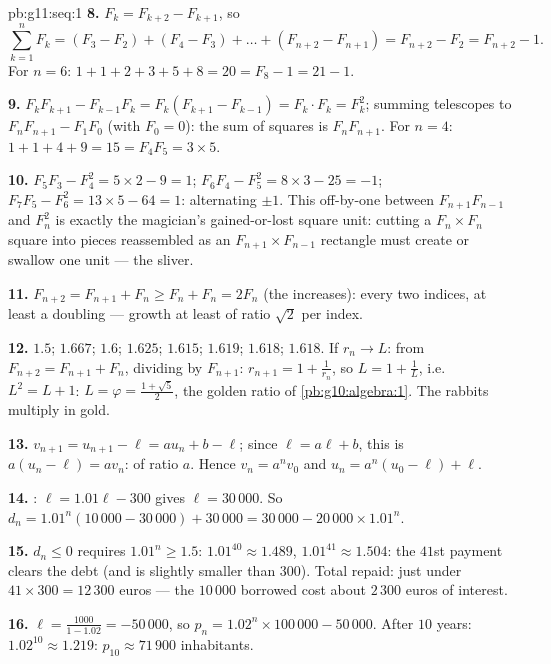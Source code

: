 \begin{solution}{pb:g11:seq:1}
\textbf{8.} $F_k = F_{k+2} - F_{k+1}$, so
\[
\sum_{k=1}^{n} F_k = (F_3 - F_2) + (F_4 - F_3) + \dots +
(F_{n+2} - F_{n+1}) = F_{n+2} - F_2 = F_{n+2} - 1 .
\]
For $n = 6$: $1 + 1 + 2 + 3 + 5 + 8 = 20 = F_8 - 1 = 21 - 1$.

\textbf{9.} $F_k F_{k+1} - F_{k-1} F_k = F_k (F_{k+1} -
F_{k-1}) = F_k \cdot F_k = F_k^2$; summing telescopes to
$F_n F_{n+1} - F_1 F_0$ (with $F_0 = 0$): the sum of squares is
$F_n F_{n+1}$. For $n = 4$: $1 + 1 + 4 + 9 = 15 = F_4 F_5 =
3 \times 5$.

\textbf{10.} $F_5 F_3 - F_4^2 = 5 \times 2 - 9 = 1$;
$F_6 F_4 - F_5^2 = 8 \times 3 - 25 = -1$;
$F_7 F_5 - F_6^2 = 13 \times 5 - 64 = 1$: alternating
$\pm 1$. This off-by-one between $F_{n+1} F_{n-1}$ and
$F_n^2$ is exactly the magician's gained-or-lost square unit:
cutting a $F_n \times F_n$ square into pieces reassembled as an
$F_{n+1} \times F_{n-1}$ rectangle must create or swallow one
unit --- the sliver.

\textbf{11.} $F_{n+2} = F_{n+1} + F_n \geq F_n + F_n = 2F_n$
(the  increases): every two indices, at least a
doubling --- growth at least  of ratio $\sqrt2$ per
index.

\textbf{12.} $1.5$; $1.667$; $1.6$; $1.625$; $1.615$;
$1.619$; $1.618$; $1.618$. If $r_n \to L$: from
$F_{n+2} = F_{n+1} + F_n$, dividing by $F_{n+1}$:
$r_{n+1} = 1 + \frac{1}{r_n}$, so $L = 1 + \frac1L$, i.e.\
$L^2 = L + 1$: $L = \varphi = \frac{1 + \sqrt5}{2}$, the golden
ratio of \cref{pb:g10:algebra:1}. The rabbits multiply in
gold.

\textbf{13.} $v_{n+1} = u_{n+1} - \ell = a u_n + b - \ell$;
since $\ell = a\ell + b$, this is $a(u_n - \ell) = a v_n$:
 of ratio $a$. Hence $v_n = a^n v_0$ and
$u_n = a^n (u_0 - \ell) + \ell$.

\textbf{14.} : $\ell = 1.01\ell - 300$ gives
$\ell = 30\,000$. So
$d_n = 1.01^n (10\,000 - 30\,000) + 30\,000
= 30\,000 - 20\,000 \times 1.01^n$.

\textbf{15.} $d_n \leq 0$ requires $1.01^n \geq 1.5$:
$1.01^{40} \approx 1.489$, $1.01^{41} \approx 1.504$: the
$41$st payment clears the debt (and is slightly smaller than
$300$). Total repaid: just under $41 \times 300 = 12\,300$
euros --- the $10\,000$ borrowed cost about $2\,300$ euros of
interest.

\textbf{16.}  $\ell = \frac{1000}{1 - 1.02} =
-50\,000$, so $p_n = 1.02^n \times 100\,000 - 50\,000$. After
$10$ years: $1.02^{10} \approx 1.219$:
$p_{10} \approx 71\,900$ inhabitants.


\end{solution}
